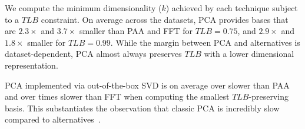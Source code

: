 We compute the minimum dimensionality ($k$) achieved by each technique subject to a $TLB$ constraint. 
On average across the datasets, PCA provides bases that are $2.3\times$ and $3.7\times$  smaller than PAA and FFT for $TLB = 0.75$, and $2.9\times$ and $1.8\times$ smaller for $TLB = 0.99$.
While the margin between PCA and alternatives is dataset-dependent, PCA almost always preserves $TLB$ with a lower dimensional representation.

%

PCA implemented via out-of-the-box SVD is on average over  slower than PAA and over  times slower than FFT when computing the smallest $TLB$-preserving basis.
This substantiates the observation that classic PCA is incredibly slow compared to alternatives~\cite{keogh-study}. 


